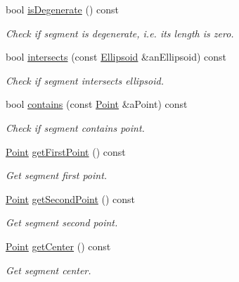 \begin{DoxyCompactItemize}
bool \hyperlink{classlibrary_1_1math_1_1geom_1_1d3_1_1objects_1_1_segment_a11324bd27db3ef9d931fdee763246759}{is\+Degenerate} () const
\begin{DoxyCompactList}\small\item\em Check if segment is degenerate, i.\+e. its length is zero. \end{DoxyCompactList}\item 
bool \hyperlink{classlibrary_1_1math_1_1geom_1_1d3_1_1objects_1_1_segment_af6d7eb00a6886d190c03e8b8e4220f33}{intersects} (const \hyperlink{classlibrary_1_1math_1_1geom_1_1d3_1_1objects_1_1_ellipsoid}{Ellipsoid} \&an\+Ellipsoid) const
\begin{DoxyCompactList}\small\item\em Check if segment intersects ellipsoid. \end{DoxyCompactList}\item 
bool \hyperlink{classlibrary_1_1math_1_1geom_1_1d3_1_1objects_1_1_segment_aabdbcd6bbfbe9350fe53f1b3563b5652}{contains} (const \hyperlink{classlibrary_1_1math_1_1geom_1_1d3_1_1objects_1_1_point}{Point} \&a\+Point) const
\begin{DoxyCompactList}\small\item\em Check if segment contains point. \end{DoxyCompactList}\item 
\hyperlink{classlibrary_1_1math_1_1geom_1_1d3_1_1objects_1_1_point}{Point} \hyperlink{classlibrary_1_1math_1_1geom_1_1d3_1_1objects_1_1_segment_aa51ef3e713b4041f852db4201bbf7821}{get\+First\+Point} () const
\begin{DoxyCompactList}\small\item\em Get segment first point. \end{DoxyCompactList}\item 
\hyperlink{classlibrary_1_1math_1_1geom_1_1d3_1_1objects_1_1_point}{Point} \hyperlink{classlibrary_1_1math_1_1geom_1_1d3_1_1objects_1_1_segment_a5d824fed334185975226d8f7e8489ced}{get\+Second\+Point} () const
\begin{DoxyCompactList}\small\item\em Get segment second point. \end{DoxyCompactList}\item 
\hyperlink{classlibrary_1_1math_1_1geom_1_1d3_1_1objects_1_1_point}{Point} \hyperlink{classlibrary_1_1math_1_1geom_1_1d3_1_1objects_1_1_segment_a6788da2dd6ee48ded2da197c01ea7f3d}{get\+Center} () const
\begin{DoxyCompactList}\small\item\em Get segment center. \end{DoxyCompactList}\item 

\end{DoxyCompactItemize}
